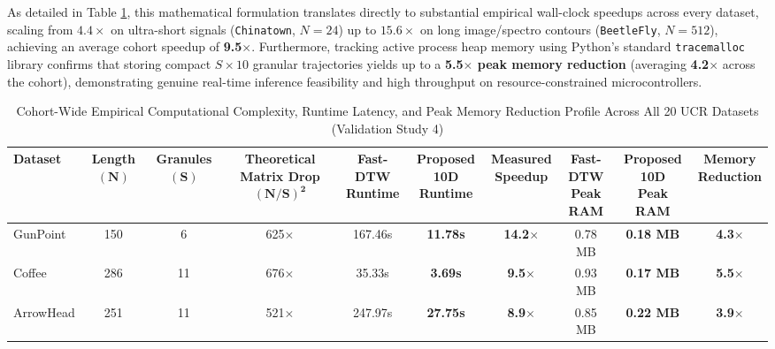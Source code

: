 \documentclass[conference]{IEEEtran}
\newcommand{\ieeetableformat}{%
  \footnotesize
  \setlength{\tabcolsep}{3pt}%
  \renewcommand{\arraystretch}{1.05}%
}
\begin{document}
As detailed in Table \ref{tab:runtime_memory_validation}, this mathematical formulation translates directly to substantial empirical wall-clock speedups across every dataset, scaling from $4.4\times$ on ultra-short signals (\texttt{Chinatown}, $N=24$) up to $15.6\times$ on long image/spectro contours (\texttt{BeetleFly}, $N=512$), achieving an average cohort speedup of \textbf{9.5$\times$}. Furthermore, tracking active process heap memory using Python's standard \texttt{tracemalloc} library confirms that storing compact $S \times 10$ granular trajectories yields up to a \textbf{5.5$\times$ peak memory reduction} (averaging \textbf{4.2$\times$} across the cohort), demonstrating genuine real-time inference feasibility and high throughput on resource-constrained microcontrollers.

\begin{table}[!t]
\caption{Cohort-Wide Empirical Computational Complexity, Runtime Latency, and Peak Memory Reduction Profile Across All 20 UCR Datasets (Validation Study 4)}
\label{tab:runtime_memory_validation}
\centering
\ieeetableformat
\setlength{\tabcolsep}{3.5pt}
\begin{tabular}{|l|c|c|c|c|c|c|c|c|c|}
\hline
\textbf{Dataset} & \shortstack{\textbf{Length}\\$\boldsymbol{(N)}$} & \shortstack{\textbf{Granules}\\$\boldsymbol{(S)}$} & \shortstack{\textbf{Theoretical}\\\textbf{Matrix Drop}\\$\boldsymbol{(N/S)^2}$} & \shortstack{\textbf{Fast-DTW}\\\textbf{Runtime}} & \shortstack{\textbf{Proposed 10D}\\\textbf{Runtime}} & \shortstack{\textbf{Measured}\\\textbf{Speedup}} & \shortstack{\textbf{Fast-DTW}\\\textbf{Peak RAM}} & \shortstack{\textbf{Proposed 10D}\\\textbf{Peak RAM}} & \shortstack{\textbf{Memory}\\\textbf{Reduction}} \\ \hline
GunPoint & 150 & 6 & 625$\times$ & 167.46s & \textbf{11.78s} & \textbf{14.2$\times$} & 0.78 MB & \textbf{0.18 MB} & \textbf{4.3$\times$} \\
Coffee & 286 & 11 & 676$\times$ & 35.33s & \textbf{3.69s} & \textbf{9.5$\times$} & 0.93 MB & \textbf{0.17 MB} & \textbf{5.5$\times$} \\
ArrowHead & 251 & 11 & 521$\times$ & 247.97s & \textbf{27.75s} & \textbf{8.9$\times$} & 0.85 MB & \textbf{0.22 MB} & \textbf{3.9$\times$} \\

\end{tabular}
\end{table}
\end{document}

